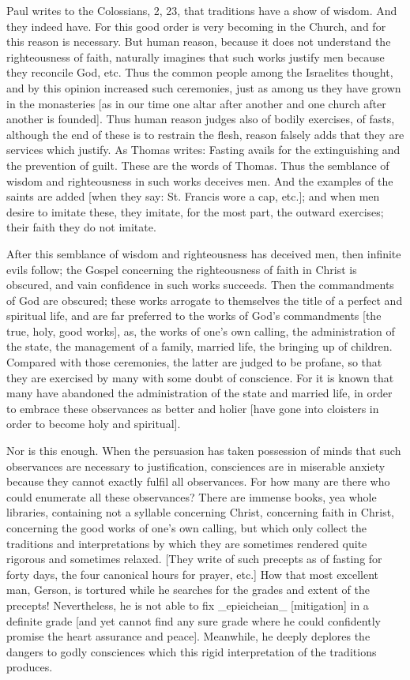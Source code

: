 Paul writes to the Colossians, 2, 23, that traditions have a show of
wisdom.  And they indeed have.  For this good order is very becoming
in the Church, and for this reason is necessary.  But human reason,
because it does not understand the righteousness of faith, naturally
imagines that such works justify men because they reconcile God, etc.
Thus the common people among the Israelites thought, and by this
opinion increased such ceremonies, just as among us they have grown
in the monasteries [as in our time one altar after another and one
church after another is founded].  Thus human reason judges also of
bodily exercises, of fasts, although the end of these is to restrain
the flesh, reason falsely adds that they are services which justify.
As Thomas writes: Fasting avails for the extinguishing and the
prevention of guilt.  These are the words of Thomas.  Thus the
semblance of wisdom and righteousness in such works deceives men.
And the examples of the saints are added [when they say: St. Francis
wore a cap, etc.]; and when men desire to imitate these, they imitate,
for the most part, the outward exercises; their faith they do not
imitate.

After this semblance of wisdom and righteousness has deceived men,
then infinite evils follow; the Gospel concerning the righteousness
of faith in Christ is obscured, and vain confidence in such works
succeeds.  Then the commandments of God are obscured; these works
arrogate to themselves the title of a perfect and spiritual life, and
are far preferred to the works of God's commandments [the true, holy,
good works], as, the works of one's own calling, the administration
of the state, the management of a family, married life, the bringing
up of children.  Compared with those ceremonies, the latter are
judged to be profane, so that they are exercised by many with some
doubt of conscience.  For it is known that many have abandoned the
administration of the state and married life, in order to embrace
these observances as better and holier [have gone into cloisters in
order to become holy and spiritual].

Nor is this enough.  When the persuasion has taken possession of
minds that such observances are necessary to justification,
consciences are in miserable anxiety because they cannot exactly
fulfil all observances.  For how many are there who could enumerate
all these observances?  There are immense books, yea whole libraries,
containing not a syllable concerning Christ, concerning faith in
Christ, concerning the good works of one's own calling, but which
only collect the traditions and interpretations by which they are
sometimes rendered quite rigorous and sometimes relaxed.  [They write
of such precepts as of fasting for forty days, the four canonical
hours for prayer, etc.] How that most excellent man, Gerson, is
tortured while he searches for the grades and extent of the precepts!
Nevertheless, he is not able to fix _epieicheian_ [mitigation] in a
definite grade [and yet cannot find any sure grade where he could
confidently promise the heart assurance and peace].  Meanwhile, he
deeply deplores the dangers to godly consciences which this rigid
interpretation of the traditions produces.

